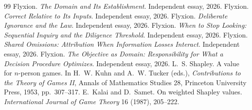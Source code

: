 \documentclass[11pt]{article}
\theoremstyle{plain}
\theoremstyle{definition}
\begin{document}
\begin{thebibliography}{99}
 Flyxion. \emph{The Domain and Its Establishment}. Independent essay, 2026.
 Flyxion. \emph{Correct Relative to Its Inputs}. Independent essay, 2026.
 Flyxion. \emph{Deliberate Ignorance and the Law}. Independent essay, 2026.
 Flyxion. \emph{When to Stop Looking: Sequential Inquiry and the Diligence Threshold}. Independent essay, 2026.
 Flyxion. \emph{Shared Omissions: Attribution When Information Losses Interact}. Independent essay, 2026.
 Flyxion. \emph{The Objective as Domain: Responsibility for What a Decision Procedure Optimizes}. Independent essay, 2026.
 L.~S. Shapley. A value for $n$-person games. In H.~W. Kuhn and A.~W. Tucker (eds.), \emph{Contributions to the Theory of Games II}, Annals of Mathematics Studies 28, Princeton University Press, 1953, pp.~307--317.
 E.~Kalai and D.~Samet. On weighted Shapley values. \emph{International Journal of Game Theory} 16 (1987), 205--222.
\end{thebibliography}
\end{document}
